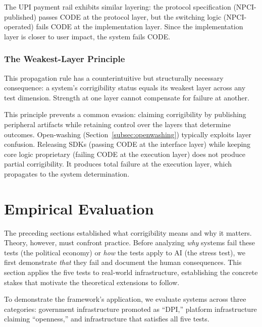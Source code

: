 \documentclass{article}
\begin{document}
The UPI payment rail exhibits similar layering: the protocol specification (NPCI-published) passes CODE at the protocol layer, but the switching logic (NPCI-operated) fails CODE at the implementation layer. Since the implementation layer is closer to user impact, the system fails CODE.

\subsubsection{The Weakest-Layer Principle}

This propagation rule has a counterintuitive but structurally necessary consequence: a system's corrigibility status equals its weakest layer across any test dimension. Strength at one layer cannot compensate for failure at another.

This principle prevents a common evasion: claiming corrigibility by publishing peripheral artifacts while retaining control over the layers that determine outcomes. Open-washing (Section~\ref{subsec:openwashing}) typically exploits layer confusion. Releasing SDKs (passing CODE at the interface layer) while keeping core logic proprietary (failing CODE at the execution layer) does not produce partial corrigibility. It produces total failure at the execution layer, which propagates to the system determination.


\section{Empirical Evaluation}
\label{sec:diagnosis}

The preceding sections established what corrigibility means and why it matters. Theory, however, must confront practice. Before analyzing \textit{why} systems fail these tests (the political economy) or \textit{how} the tests apply to AI (the stress test), we first demonstrate \textit{that} they fail and document the human consequences. This section applies the five tests to real-world infrastructure, establishing the concrete stakes that motivate the theoretical extensions to follow.

To demonstrate the framework's application, we evaluate systems across three categories: government infrastructure promoted as ``DPI,'' platform infrastructure claiming ``openness,'' and infrastructure that satisfies all five tests.
\end{document}
